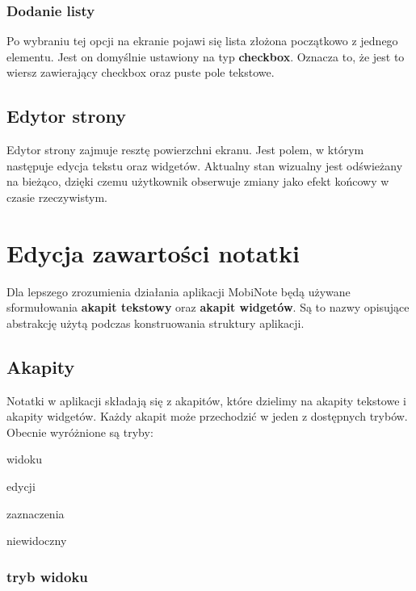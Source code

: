 \subsubsection{Dodanie listy}

Po wybraniu tej opcji na ekranie pojawi się lista złożona początkowo z jednego elementu.
Jest on domyślnie ustawiony na typ \textbf{checkbox}. Oznacza to, że jest to wiersz zawierający checkbox oraz puste pole tekstowe.

\subsection{Edytor strony}

Edytor strony zajmuje resztę powierzchni ekranu. Jest polem, w którym następuje edycja tekstu oraz widgetów. Aktualny stan wizualny jest odświeżany na bieżąco, dzięki czemu użytkownik obserwuje zmiany jako efekt końcowy w czasie rzeczywistym.



\section{Edycja zawartości notatki}

Dla lepszego zrozumienia działania aplikacji MobiNote będą używane sformułowania \textbf{akapit tekstowy} oraz \textbf{akapit widgetów}.
Są to nazwy opisujące abstrakcję użytą podczas konstruowania struktury aplikacji.

\subsection{Akapity}

Notatki w aplikacji składają się z akapitów, które dzielimy na akapity tekstowe i akapity widgetów.
Każdy akapit może przechodzić w jeden z dostępnych trybów.
Obecnie wyróżnione są tryby:

\begin{compactitem}
    \item widoku
    \item edycji
    \item zaznaczenia
    \item niewidoczny
\end{compactitem}

\subsubsection{tryb widoku}

